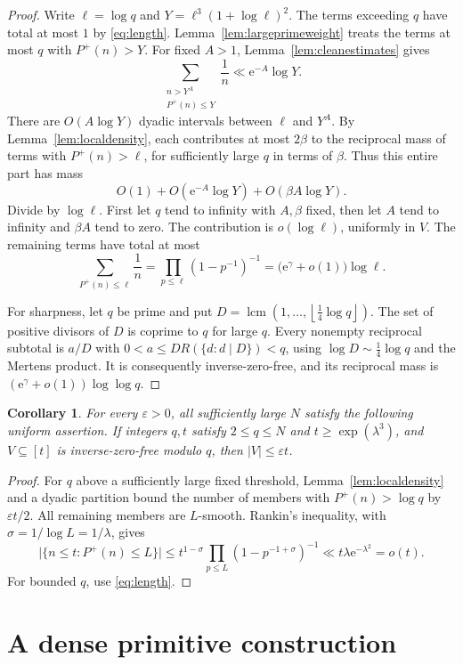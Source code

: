 \documentclass[11pt,leqno]{amsart}
\numberwithin{equation}{section}
\newtheorem{corollary}[theorem]{Corollary}
\theoremstyle{definition}
\theoremstyle{remark}
\newcommand{\e}{\mathrm e}
\newcommand{\lcm}{\operatorname{lcm}}
\newcommand{\eps}{\varepsilon}
\newcommand{\Ph}{P^{+}}
\newcommand{\card}[1]{\lvert #1\rvert}
\newcommand{\floor}[1]{\left\lfloor #1\right\rfloor}
\begin{document}
\begin{proof}
Write $\ell=\log q$ and $Y=\ell^3(1+\log\ell)^2$.
The terms exceeding $q$ have total at most $1$ by \eqref{eq:length}.
Lemma~\ref{lem:largeprimeweight} treats the terms at most $q$ with
$\Ph(n)>Y$. For fixed $A>1$, Lemma~\ref{lem:cleanestimates} gives
\[
 \sum_{\substack{n>Y^A\\\Ph(n)\le Y}}\frac1n
 \ll\e^{-A}\log Y.
\]
There are $O(A\log Y)$ dyadic intervals between $\ell$ and $Y^A$.
By Lemma~\ref{lem:localdensity}, each contributes at most $2\beta$ to
the reciprocal mass of terms with $\Ph(n)>\ell$, for sufficiently large
$q$ in terms of $\beta$. Thus this entire part has mass
\[
 O(1)+O(\e^{-A}\log Y)+O(\beta A\log Y).
\]
Divide by $\log\ell$. First let $q$ tend to infinity with $A,\beta$
fixed, then let $A$ tend to infinity and $\beta A$ tend to zero.
The contribution is $o(\log\ell)$, uniformly in $V$.
The remaining terms have total at most
\[
 \sum_{\Ph(n)\le\ell}\frac1n
 =\prod_{p\le\ell}(1-p^{-1})^{-1}
 =\bigl(\e^\gamma+o(1)\bigr)\log\ell.
\]

For sharpness, let $q$ be prime and put
$D=\lcm(1,\ldots,\floor{\tfrac14\log q})$.
The set of positive divisors of $D$ is coprime to $q$ for large $q$.
Every nonempty reciprocal subtotal is $a/D$ with
$0<a\le DR(\{d:d\mid D\})<q$, using
$\log D\sim\tfrac14\log q$ and the Mertens product.
It is consequently inverse-zero-free, and its reciprocal mass is
$(\e^\gamma+o(1))\log\log q$.
\end{proof}

\begin{corollary}\label{cor:uniformdensity}
For every $\eps>0$, all sufficiently large $N$ satisfy the following
uniform assertion. If integers $q,t$ satisfy $2\le q\le N$ and
$t\ge\exp(\lambda^3)$, and
$V\subseteq[t]$ is inverse-zero-free modulo $q$, then
$\card V\le\eps t$.
\end{corollary}

\begin{proof}
For $q$ above a sufficiently large fixed threshold,
Lemma~\ref{lem:localdensity} and a dyadic partition bound the number of
members with $\Ph(n)>\log q$ by $\eps t/2$.
All remaining members are $L$-smooth. Rankin's inequality, with
$\sigma=1/\log L=1/\lambda$, gives
\[
 \card{\{n\le t:\Ph(n)\le L\}}
 \le t^{1-\sigma}\prod_{p\le L}(1-p^{-1+\sigma})^{-1}
 \ll t\lambda\e^{-\lambda^2}=o(t).
\]
For bounded $q$, use \eqref{eq:length}.
\end{proof}

\section{A dense primitive construction}\label{sec:construction}
\end{document}
